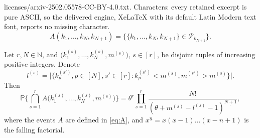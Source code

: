 \documentclass[10pt,a4paper]{amsart}
\newcommand{\N}{\mathbb{N}}
\newcommand{\Pc}{\mathcal{P}}
\begin{document}
licenses/arxiv-2502.05578-CC-BY-4.0.txt. Characters: every retained excerpt is pure ASCII, so the delivered engine, XeLaTeX with its default Latin Modern text font, reports no missing character.
	\begin{equation}
		\label{eq:A}
		A(k_1,\ldots,k_N,k_{N+1}) = \bigl\{\{k_1,\ldots,k_N,k_{N+1}\}
		\in \Pc_{k_{N+1}}\bigr\}.
	\end{equation}

	\begin{lemma}
		\label{lem:1}
		Let $r,N \in \N$, and $\bigl(k_1^{(s)},\dots,k_N^{(s)}, m^{(s)}\bigr)$, $s\in [r]$, be disjoint tuples of increasing positive integers. Denote
		\begin{equation}
			\label{eq:ls}
			l^{(s)} = \bigl|\bigl\{k_p^{(s')},p\in[N],s'\in[r]:
			k_p^{(s')}<m^{(s)}, m^{(s')} > m^{(s)}\bigr\}\bigr|.
		\end{equation}
		Then
		\begin{equation}
			\label{eq:joint_prob}
			\mathbb{P}\biggl\{\bigcap_{s=1}^r A\bigl(k_1^{(s)}, \dots, k_N^{(s)}, m^{(s)}\bigr)\biggr\} = 
			\theta^r\prod_{s=1}^r \frac{N!}{\left(\theta + m^{(s)} - l^{(s)} - 1\right)^{\underline{N+1}}},
		\end{equation}
		where the events $A$ are defined in \eqref{eq:A}, and $x^{\underline n} = x (x-1) \ldots (x-n+1)$ is the falling factorial.
	\end{lemma}
\end{document}
